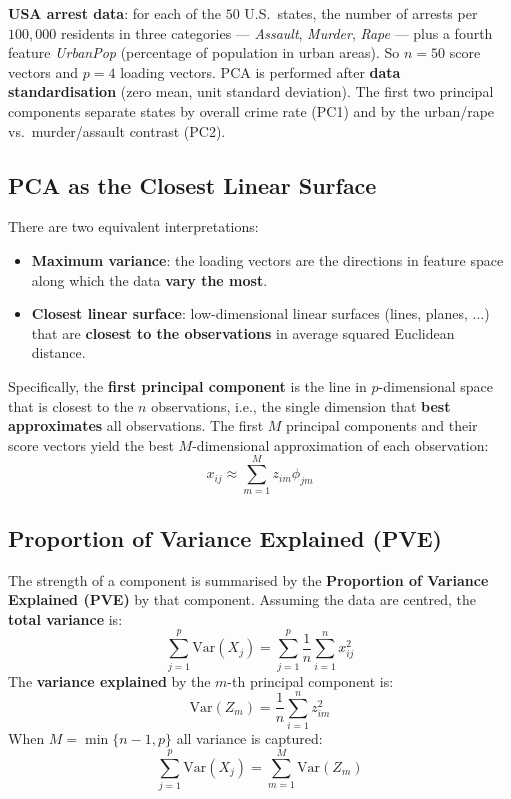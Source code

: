 \documentclass[11pt,a4paper]{article}
\theoremstyle{definition}
\theoremstyle{plain}
\theoremstyle{remark}
\begin{document}
\textbf{USA arrest data}: for each of the $50$ U.S.\ states, the number of arrests per $100{,}000$ residents in three categories — \textit{Assault}, \textit{Murder}, \textit{Rape} — plus a fourth feature \textit{UrbanPop} (percentage of population in urban areas). So $n = 50$ score vectors and $p = 4$ loading vectors. PCA is performed after \textbf{data standardisation} (zero mean, unit standard deviation). The first two principal components separate states by overall crime rate (PC1) and by the urban/rape vs.\ murder/assault contrast (PC2).

\subsection{PCA as the Closest Linear Surface}

There are two equivalent interpretations:
\begin{itemize}
    \item \textbf{Maximum variance}: the loading vectors are the directions in feature space along which the data \textbf{vary the most}.
    \item \textbf{Closest linear surface}: low-dimensional linear surfaces (lines, planes, $\ldots$) that are \textbf{closest to the observations} in average squared Euclidean distance.
\end{itemize}
Specifically, the \textbf{first principal component} is the line in $p$-dimensional space that is closest to the $n$ observations, i.e., the single dimension that \textbf{best approximates} all observations. The first $M$ principal components and their score vectors yield the best $M$-dimensional approximation of each observation:
\[
    x_{ij} \approx \sum_{m=1}^{M} z_{im} \phi_{jm}
\]

\subsection{Proportion of Variance Explained (PVE)}

The strength of a component is summarised by the \textbf{Proportion of Variance Explained (PVE)} by that component. Assuming the data are centred, the \textbf{total variance} is:
\[
    \sum_{j=1}^{p} \mathrm{Var}(X_j) = \sum_{j=1}^{p} \frac{1}{n} \sum_{i=1}^{n} x_{ij}^2
\]
The \textbf{variance explained} by the $m$-th principal component is:
\[
    \mathrm{Var}(Z_m) = \frac{1}{n} \sum_{i=1}^{n} z_{im}^2
\]
When $M = \min\{n-1, p\}$ all variance is captured:
\[
    \sum_{j=1}^{p} \mathrm{Var}(X_j) = \sum_{m=1}^{M} \mathrm{Var}(Z_m)
\]
\end{document}
